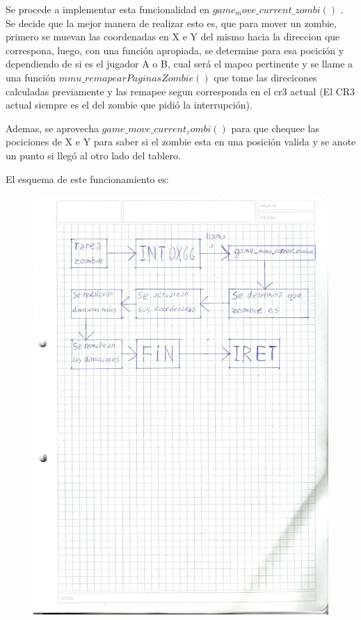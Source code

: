 \documentclass[a4paper]{article}
\begin{document}
Se procede a implementar esta funcionalidad en $game_move\_current\_zombi()$ . Se decide que la mejor manera de realizar esto es, que para mover un zombie, primero se muevan las coordenadas en X e Y del mismo hacia la direccion que correspona, luego, con una función apropiada, se determine para esa pocición y dependiendo de si es el jugador A o B, cual será el mapeo pertinente y se llame a una función $mmu\_remapearPaginasZombie()$ que tome las direcicones calculadas previamente y las remapee segun corresponda en el cr3 actual (El CR3 actual siempre es el del zombie que pidió la interrupción).

Ademas, se aprovecha $game\_move\_current_zombi()$ para que chequee las pociciones de X e Y para saber si el zombie esta en una posición valida y se anote un punto si llegó al otro lado del tablero.

El esquema de este funcionamiento es:

\begin{figure}[h!]
  \begin{center}
\includegraphics[scale=0.7]{Dibujos/dibujo3.jpg}\\
  \end{center}
\end{figure}
\end{document}
